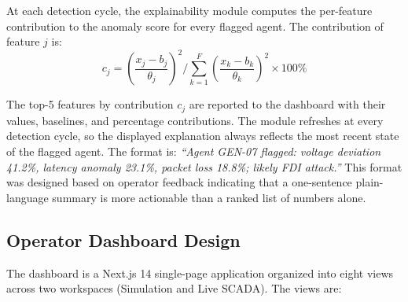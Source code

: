 At each detection cycle, the explainability module computes the per-feature contribution to the
anomaly score for every flagged agent. The contribution of feature $j$ is:
\begin{equation}
c_j = \left(\frac{x_j - b_j}{\theta_j}\right)^2 \Bigg/
\sum_{k=1}^{F} \left(\frac{x_k - b_k}{\theta_k}\right)^2 \times 100\%
\label{eq:contrib}
\end{equation}

The top-5 features by contribution $c_j$ are reported to the dashboard with their values, baselines,
and percentage contributions. The module refreshes at every detection cycle, so the displayed
explanation always reflects the most recent state of the flagged agent. The format is:
\textit{``Agent GEN-07 flagged: voltage deviation 41.2\%, latency anomaly 23.1\%, packet loss 18.8\%;
likely FDI attack.''} This format was designed based on operator feedback indicating that a
one-sentence plain-language summary is more actionable than a ranked list of numbers alone.

\subsection{Operator Dashboard Design}
\label{sec:dashboard}

The dashboard is a Next.js 14 single-page application organized into eight views across two
workspaces (Simulation and Live SCADA). The views are:

